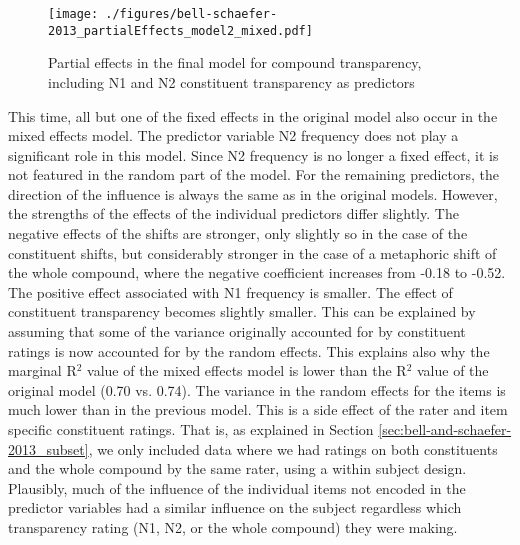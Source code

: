\begin{figure}[!htb]
  \centering
\texttt{[image: ./figures/bell-schaefer-2013\_partialEffects\_model2\_mixed.pdf]}
  
  \caption{Partial effects in the final model for compound
    transparency, including N1 and N2 constituent transparency as predictors}
\label{fig:bellschaefer2013_model_2-mixed-effects}
\end{figure}
This time, all but one of the fixed effects in the original model
also occur in the mixed effects model. The predictor variable
N2 frequency does not play a significant role in this model. Since N2
frequency is no longer a fixed effect, it is not featured in the
random part of the model. For the remaining predictors, the direction of the influence is always the
same as in the original models. However, the strengths of the effects of the individual predictors
differ slightly. The negative effects of the shifts are stronger, only slightly so in
the case of the constituent shifts, but considerably stronger in the case of a
metaphoric shift of the whole compound, where the negative coefficient increases
from -0.18 to -0.52. The positive effect associated with N1
frequency is smaller. The effect of
constituent transparency becomes slightly smaller. This can be
explained by assuming that some of the variance originally accounted for by constituent
ratings is now accounted for by the random effects. This explains also
why the marginal R$^2$ value of the mixed effects model is lower than
the R$^2$ value of the original model (0.70 vs. 0.74). The variance in
the random effects for the items is much lower than in the previous model. This is a
side effect of the rater and item specific constituent ratings. That
is, as explained in Section \ref{sec:bell-and-schaefer-2013_subset},
we only included data where we had ratings on both constituents and
the whole compound by the same rater, using a within subject
design. Plausibly, much of the influence of the individual items not encoded
in the predictor variables had a similar influence on the subject
regardless which transparency rating (N1, N2, or the whole compound)
they were making.

